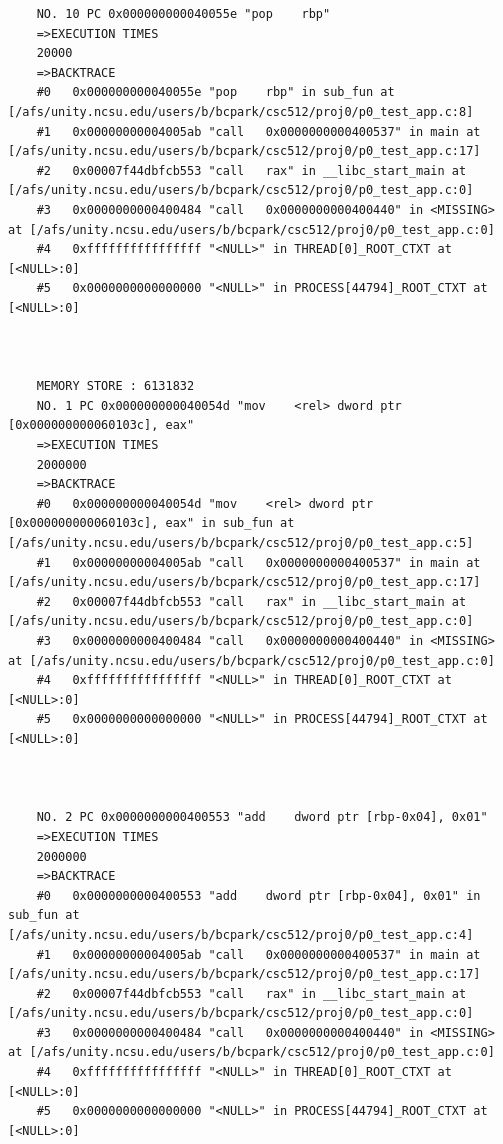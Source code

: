 \documentclass[11pt]{article}
\begin{document}
\begin{verbatim}
    NO. 10 PC 0x000000000040055e "pop    rbp"
    =>EXECUTION TIMES
    20000
    =>BACKTRACE
    #0   0x000000000040055e "pop    rbp" in sub_fun at [/afs/unity.ncsu.edu/users/b/bcpark/csc512/proj0/p0_test_app.c:8]
    #1   0x00000000004005ab "call   0x0000000000400537" in main at [/afs/unity.ncsu.edu/users/b/bcpark/csc512/proj0/p0_test_app.c:17]
    #2   0x00007f44dbfcb553 "call   rax" in __libc_start_main at [/afs/unity.ncsu.edu/users/b/bcpark/csc512/proj0/p0_test_app.c:0]
    #3   0x0000000000400484 "call   0x0000000000400440" in <MISSING> at [/afs/unity.ncsu.edu/users/b/bcpark/csc512/proj0/p0_test_app.c:0]
    #4   0xffffffffffffffff "<NULL>" in THREAD[0]_ROOT_CTXT at [<NULL>:0]
    #5   0x0000000000000000 "<NULL>" in PROCESS[44794]_ROOT_CTXT at [<NULL>:0]
    
    
    
    MEMORY STORE : 6131832
    NO. 1 PC 0x000000000040054d "mov    <rel> dword ptr [0x000000000060103c], eax"
    =>EXECUTION TIMES
    2000000
    =>BACKTRACE
    #0   0x000000000040054d "mov    <rel> dword ptr [0x000000000060103c], eax" in sub_fun at [/afs/unity.ncsu.edu/users/b/bcpark/csc512/proj0/p0_test_app.c:5]
    #1   0x00000000004005ab "call   0x0000000000400537" in main at [/afs/unity.ncsu.edu/users/b/bcpark/csc512/proj0/p0_test_app.c:17]
    #2   0x00007f44dbfcb553 "call   rax" in __libc_start_main at [/afs/unity.ncsu.edu/users/b/bcpark/csc512/proj0/p0_test_app.c:0]
    #3   0x0000000000400484 "call   0x0000000000400440" in <MISSING> at [/afs/unity.ncsu.edu/users/b/bcpark/csc512/proj0/p0_test_app.c:0]
    #4   0xffffffffffffffff "<NULL>" in THREAD[0]_ROOT_CTXT at [<NULL>:0]
    #5   0x0000000000000000 "<NULL>" in PROCESS[44794]_ROOT_CTXT at [<NULL>:0]
    
    
    
    NO. 2 PC 0x0000000000400553 "add    dword ptr [rbp-0x04], 0x01"
    =>EXECUTION TIMES
    2000000
    =>BACKTRACE
    #0   0x0000000000400553 "add    dword ptr [rbp-0x04], 0x01" in sub_fun at [/afs/unity.ncsu.edu/users/b/bcpark/csc512/proj0/p0_test_app.c:4]
    #1   0x00000000004005ab "call   0x0000000000400537" in main at [/afs/unity.ncsu.edu/users/b/bcpark/csc512/proj0/p0_test_app.c:17]
    #2   0x00007f44dbfcb553 "call   rax" in __libc_start_main at [/afs/unity.ncsu.edu/users/b/bcpark/csc512/proj0/p0_test_app.c:0]
    #3   0x0000000000400484 "call   0x0000000000400440" in <MISSING> at [/afs/unity.ncsu.edu/users/b/bcpark/csc512/proj0/p0_test_app.c:0]
    #4   0xffffffffffffffff "<NULL>" in THREAD[0]_ROOT_CTXT at [<NULL>:0]
    #5   0x0000000000000000 "<NULL>" in PROCESS[44794]_ROOT_CTXT at [<NULL>:0]
    

\end{verbatim}
\end{document}
